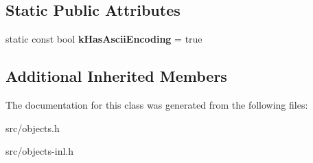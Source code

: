 \subsection*{Static Public Attributes}
\begin{DoxyCompactItemize}
\item 
\hypertarget{classv8_1_1internal_1_1_external_ascii_string_a7121017f5c49ab5f1b6406503a8d94f9}{}static const bool {\bfseries k\+Has\+Ascii\+Encoding} = true\label{classv8_1_1internal_1_1_external_ascii_string_a7121017f5c49ab5f1b6406503a8d94f9}

\end{DoxyCompactItemize}
\subsection*{Additional Inherited Members}


The documentation for this class was generated from the following files\+:\begin{DoxyCompactItemize}
\item 
src/objects.\+h\item 
src/objects-\/inl.\+h\end{DoxyCompactItemize}
